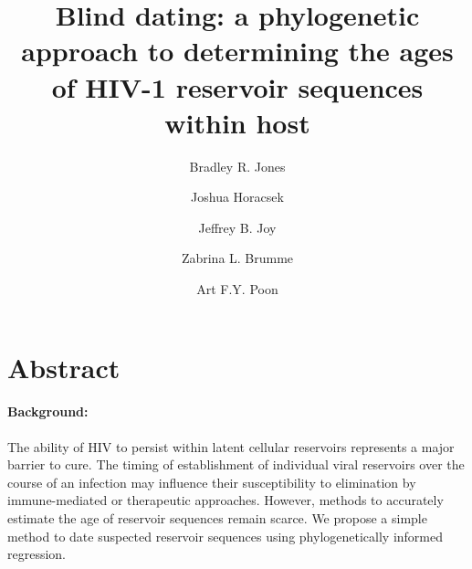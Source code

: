 \documentclass[12pt]{article}
\begin{document}
\title{Blind dating: a phylogenetic approach to determining the ages of HIV-1 reservoir sequences within host}

\author[1,2]{Bradley R. Jones} %
\author[1,2]{Joshua Horacsek} %
\author[2]{Jeffrey B. Joy} %
\author[1,2]{Zabrina L. Brumme} %
\author[1,2,3,*]{Art F.Y. Poon} %

\baselineskip 30pt
\pagewiselinenumbers

\date{}
\maketitle

\section * {Abstract}

\paragraph{Background:}
The ability of HIV to persist within latent cellular reservoirs represents a major barrier to
cure.
The timing of establishment of individual viral reservoirs over the course of an infection may influence their susceptibility to elimination by immune-mediated or therapeutic approaches.
However, methods to accurately estimate the age of reservoir sequences remain scarce.
We propose a simple method to date suspected reservoir sequences using phylogenetically informed regression.
 
\end{document}
